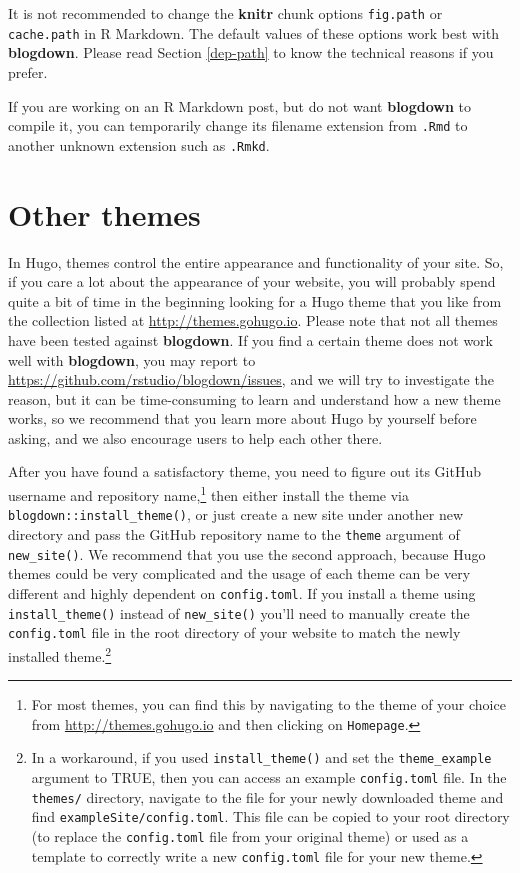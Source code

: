 \documentclass[12pt,]{krantz}
\theoremstyle{definition}
\theoremstyle{definition}
\theoremstyle{definition}
\theoremstyle{remark}
\begin{document}
It is not recommended to change the \textbf{knitr} chunk options
\texttt{fig.path} or \texttt{cache.path} in R Markdown. The default
values of these options work best with \textbf{blogdown}. Please read
Section \ref{dep-path} to know the technical reasons if you prefer.

If you are working on an R Markdown post, but do not want
\textbf{blogdown} to compile it, you can temporarily change its filename
extension from \texttt{.Rmd} to another unknown extension such as
\texttt{.Rmkd}.

\section{Other themes}\label{other-themes}

In Hugo, themes control the entire appearance and
functionality of your site. So, if you care a lot about the appearance
of your website, you will probably spend quite a bit of time in the
beginning looking for a Hugo theme that you like from the collection
listed at \url{http://themes.gohugo.io}. Please note that not all themes
have been tested against \textbf{blogdown}. If you find a certain theme
does not work well with \textbf{blogdown}, you may report to
\url{https://github.com/rstudio/blogdown/issues}, and we will try to
investigate the reason, but it can be time-consuming to learn and
understand how a new theme works, so we recommend that you learn more
about Hugo by yourself before asking, and we also encourage users to
help each other there.

After you have found a satisfactory theme, you need to figure out its
GitHub username and repository name,\footnote{For most themes, you can
  find this by navigating to the theme of your choice from
  \url{http://themes.gohugo.io} and then clicking on \texttt{Homepage}.}
then either install the theme via
\texttt{blogdown::install\_theme()}, or just create a new site under
another new directory and pass the GitHub repository name to the
\texttt{theme} argument of \texttt{new\_site()}. We recommend that you
use the second approach, because Hugo themes could be very complicated
and the usage of each theme can be very different and highly dependent
on \texttt{config.toml}. If you install a theme using
\texttt{install\_theme()} instead of \texttt{new\_site()} you'll need to
manually create the \texttt{config.toml} file in the root directory of
your website to match the newly installed theme.\footnote{In a
  workaround, if you used \texttt{install\_theme()} and set the
  \texttt{theme\_example} argument to TRUE, then you can access an
  example \texttt{config.toml} file. In the \texttt{themes/} directory,
  navigate to the file for your newly downloaded theme and find
  \texttt{exampleSite/config.toml}. This file can be copied to your root
  directory (to replace the \texttt{config.toml} file from your original
  theme) or used as a template to correctly write a new
  \texttt{config.toml} file for your new theme.}
\end{document}
